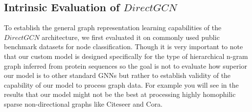 \documentclass[utf8]{FrontiersinHarvard}
\begin{document}
	\subsection{Intrinsic Evaluation of $DirectGCN$}
	To establish the general graph representation learning capabilities of the  $DirectGCN$ architecture, we first evaluated it on commonly used public benchmark datasets for node classification. Though it  is very important to note that our custom model is designed specifically for the type of hierarchical n-gram graph inferred from protein sequences so the goal is not to evaluate how superior our model is to other standard GNNs but rather to establish validity of the capability of our model to process graph data. For example you will see in the results that our model might not be the best at processing highly homophilic sparse non-directional graphs like Citeseer and Cora.
	
\end{document}
